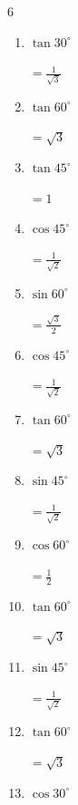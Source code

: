 \begin{multicols}{6}
\begin{enumerate}
        $\displaystyle =\frac{1}{\sqrt{2}}$

  \item $\displaystyle \tan{30^\circ}$

        $\displaystyle =\frac{1}{\sqrt{3}}$

  \item $\displaystyle \tan{60^\circ}$

        $\displaystyle =\sqrt{3}$

  \item $\displaystyle \tan{45^\circ}$

        $\displaystyle =1$

  \item $\displaystyle \cos{45^\circ}$

        $\displaystyle =\frac{1}{\sqrt{2}}$

  \item $\displaystyle \sin{60^\circ}$

        $\displaystyle =\frac{\sqrt{3}}{2}$

  \item $\displaystyle \cos{45^\circ}$

        $\displaystyle =\frac{1}{\sqrt{2}}$

  \item $\displaystyle \tan{60^\circ}$

        $\displaystyle =\sqrt{3}$

  \item $\displaystyle \sin{45^\circ}$

        $\displaystyle =\frac{1}{\sqrt{2}}$

  \item $\displaystyle \cos{60^\circ}$

        $\displaystyle =\frac{1}{2}$

  \item $\displaystyle \tan{60^\circ}$

        $\displaystyle =\sqrt{3}$

  \item $\displaystyle \sin{45^\circ}$

        $\displaystyle =\frac{1}{\sqrt{2}}$

  \item $\displaystyle \tan{60^\circ}$

        $\displaystyle =\sqrt{3}$

\columnbreak %

  \item $\displaystyle \cos{30^\circ}$


\end{enumerate}
\end{multicols}
